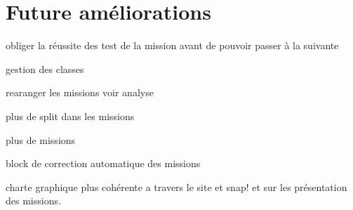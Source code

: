 \chapter{Future améliorations}
obliger la réussite des test de la mission avant de pouvoir passer à la suivante

gestion des classes

rearanger les missions voir analyse

plus de split dans les missions

plus de missions

block de correction automatique des missions

charte graphique plus cohérente a travers le site et snap! et sur les présentation des missions.
